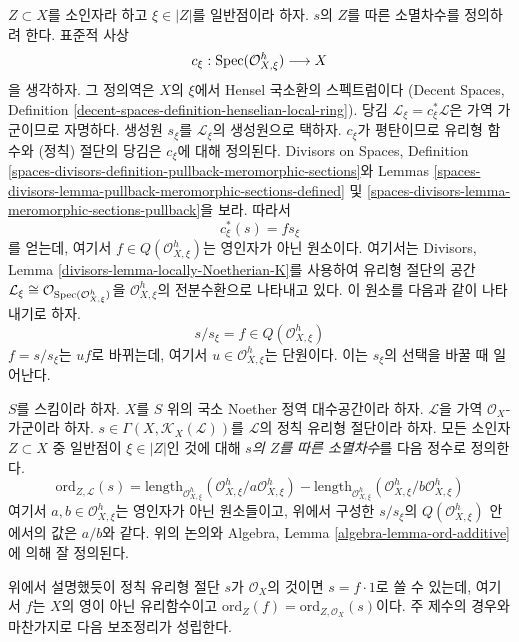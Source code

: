 \medskip\noindent
$Z \subset X$를 소인자라 하고 $\xi \in |Z|$를 일반점이라 하자. $s$의
$Z$를 따른 소멸차수를 정의하려 한다. 표준적 사상
$$
c_\xi : \mathop{\mathrm{Spec}}(\mathcal{O}_{X, \xi}^h) \longrightarrow X
$$
을 생각하자. 그 정의역은 $X$의 $\xi$에서 Hensel 국소환의 스펙트럼이다
(Decent Spaces, Definition
\ref{decent-spaces-definition-henselian-local-ring}). 당김
$\mathcal{L}_\xi = c_\xi^*\mathcal{L}$은 가역 가군이므로 자명하다.
생성원 $s_\xi$를 $\mathcal{L}_\xi$의 생성원으로 택하자. $c_\xi$가 평탄이므로
유리형 함수와 (정칙) 절단의 당김은 $c_\xi$에 대해 정의된다. Divisors
on Spaces, Definition
\ref{spaces-divisors-definition-pullback-meromorphic-sections}와 Lemmas
\ref{spaces-divisors-lemma-pullback-meromorphic-sections-defined} 및
\ref{spaces-divisors-lemma-meromorphic-sections-pullback}을 보라. 따라서
$$
c_\xi^*(s) = f s_\xi
$$
를 얻는데, 여기서 $f \in Q(\mathcal{O}_{X, \xi}^h)$는 영인자가 아닌
원소이다. 여기서는 Divisors, Lemma
\ref{divisors-lemma-locally-Noetherian-K}를 사용하여 유리형 절단의
공간 $\mathcal{L}_\xi \cong
\mathcal{O}_{\mathop{\mathrm{Spec}}(\mathcal{O}_{X, \xi}^h)}$을
$\mathcal{O}_{X, \xi}^h$의 전분수환으로 나타내고 있다. 이 원소를
다음과 같이 나타내기로 하자.
$$
s/s_\xi = f \in  Q(\mathcal{O}_{X, \xi}^h)
$$
$f = s/s_\xi$는 $uf$로 바뀌는데, 여기서
$u \in \mathcal{O}_{X, \xi}^h$는 단원이다. 이는 $s_\xi$의 선택을
바꿀 때 일어난다.

\begin{definition}
\label{definition-order-vanishing-meromorphic}
$S$를 스킴이라 하자.
$X$를 $S$ 위의 국소 Noether 정역 대수공간이라 하자. $\mathcal{L}$을
가역 $\mathcal{O}_X$-가군이라 하자.
$s \in \Gamma(X, \mathcal{K}_X(\mathcal{L}))$를 $\mathcal{L}$의 정칙
유리형 절단이라 하자. 모든 소인자 $Z \subset X$ 중 일반점이
$\xi \in |Z|$인 것에 대해 {\it $s$의 $Z$를 따른 소멸차수}를 다음 정수로
정의한다.
$$
\text{ord}_{Z, \mathcal{L}}(s) =
\text{length}_{\mathcal{O}_{X, \xi}^h}
(\mathcal{O}_{X, \xi}^h/a \mathcal{O}_{X, \xi}^h) -
\text{length}_{\mathcal{O}_{X, \xi}^h}
(\mathcal{O}_{X, \xi}^h/b \mathcal{O}_{X, \xi}^h)
$$
여기서 $a, b \in \mathcal{O}_{X, \xi}^h$는 영인자가 아닌 원소들이고,
위에서 구성한 $s/s_\xi$의 $Q(\mathcal{O}_{X, \xi}^h)$ 안에서의 값은
$a/b$와 같다. 위의 논의와 Algebra, Lemma
\ref{algebra-lemma-ord-additive}에 의해 잘 정의된다.
\end{definition}

\noindent
위에서 설명했듯이 정칙 유리형 절단 $s$가 $\mathcal{O}_X$의 것이면
$s = f \cdot 1$로 쓸 수 있는데, 여기서 $f$는 $X$의 영이 아닌
유리함수이고 $\text{ord}_Z(f) = \text{ord}_{Z, \mathcal{O}_X}(s)$이다.
주 제수의 경우와 마찬가지로 다음 보조정리가 성립한다.

